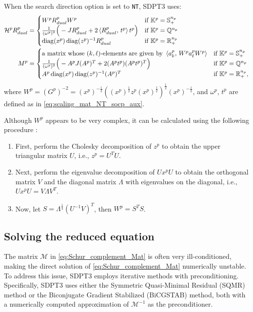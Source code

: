 When the search direction option is set to \texttt{NT}, SDPT3 uses:
\begin{align}
    \mathcal{H}^p R^p_{dual} &= \begin{cases}
        W^p R^p_{dual} W^p & \text{if} ~ \mathbb{K}^p=\mathbb{S}^{n_p}_+ \\
        \frac{1}{(\omega^p)^2} \Big(-J R^p_{dual} + 2\left\langle R^p_{dual}, \, t^p \right\rangle t^p\Big) & \text{if} ~ \mathbb{K}^p=\mathbb{Q}^{n_p}\\
        \operatorname{diag}(x^p) \operatorname{diag}(z^p)^{-1} R^p_{dual} & \text{if} ~ \mathbb{K}^p=\mathbb{R}^{n_p}_+
    \end{cases}\\
    M^p &= \begin{cases}
        \text{a matrix whose $(k,\ell)$-elements are given by } \left\langle a^p_k, \, W^p a^p_\ell W^p \right\rangle & \text{if} ~ \mathbb{K}^p=\mathbb{S}^{n_p}_+\\
        \frac{1}{(\omega^p)^2}\Big(-A^p J (A^p)^T + 2 (A^p t^p)(A^p t^p)^T \Big) & \text{if} ~ \mathbb{K}^p=\mathbb{Q}^{n_p} \\
        A^p \operatorname{diag}(x^p) \operatorname{diag}(z^p)^{-1} (A^p)^T & \text{if} ~ \mathbb{K}^p=\mathbb{R}^{n_p}_+,
    \end{cases} \label{eq:NT_M}
\end{align}
where $W^p = (G^p)^{-2} = (x^p)^{-\frac{1}{2}}((x^p)^{\frac{1}{2}} z^p (x^p)^{\frac{1}{2}})^{\frac{1}{2}} (x^p)^{-\frac{1}{2}}$, and $\omega^p$, $t^p$ are defined as in \eqref{eq:scaling_mat_NT_socp_aux}.

Although $W^p$ appears to be very complex, it can be calculated using the following procedure \cite{todd1998}:
\begin{enumerate}
    \item First, perform the Cholesky decomposition of $z^p$ to obtain the upper triangular matrix $U$, i.e., $z^p=U^TU$.
    \item Next, perform the eigenvalue decomposition of $U x^p U$ to obtain the orthogonal matrix $V$ and the diagonal matrix $\Lambda$ with eigenvalues on the diagonal, i.e., $U x^p U = V \Lambda V^T$.
    \item Now, let $S=\Lambda^\frac{1}{4}(U^{-1}V)^T$, then $W^p=S^T S$.
\end{enumerate}


\subsection{Solving the reduced equation}
The matrix $\mathcal{M}$ in \eqref{eq:Schur_complement_Mat} is often very ill-conditioned, making the direct solution of \eqref{eq:Schur_complement_Mat} numerically unstable. 
To address this issue, SDPT3 employs iterative methods with preconditioning. 
Specifically, SDPT3 \cite{toh1999} uses either the Symmetric Quasi-Minimal Residual (SQMR) method \cite{Freund1994} or the Biconjugate Gradient Stabilized (BiCGSTAB) method, both with a numerically computed approximation of $\mathcal{M}^{-1}$ as the preconditioner.

